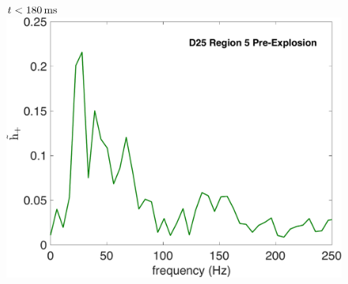\documentclass[aspectratio=169]{beamer}
\begin{document}
\begin{frame}
\begin{columns}[c]
    \begin{figure}
      $t<180\,\mathrm{ms}$
      \includegraphics[width=1.0\textwidth]{Figures/D25_PreE.pdf}
    \end{figure}

  \end{columns}

\end{frame}
\end{document}
